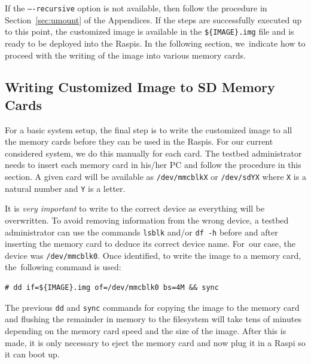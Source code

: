 \documentclass[electronics,article,accept,moreauthors,pdftex,10pt,a4paper]{mdpi}
\theoremstyle{mdpi}
\newcounter{ex}
\newcounter{re}
\theoremstyle{mdpidefinition}
\begin{document}
If the \texttt{----recursive} option is not available, then follow the
procedure in Section~\ref{sec:umount} of the Appendices.
If the steps are successfully executed up to this point, the customized image
is available in the \texttt{\$\{IMAGE\}.img} file and is ready to be deployed
into the Raspis. In the following section, we~indicate how to proceed
with the writing of the image into various memory cards.

\subsection{Writing Customized Image to SD Memory Cards}
For a basic system setup, the final step is to write the customized image
to all the memory cards before they can be used in the Raspis. For
our current considered system, we do this manually for each card.
The testbed administrator needs to insert each memory card in his/her PC
and follow the procedure in this section. A given card will be available as
\texttt{/dev/mmcblkX} or \texttt{/dev/sdYX} where \texttt{X} is a natural number
and \texttt{Y} is a letter.

It is \textit{very important} to write to the correct device as
everything will be overwritten. To avoid removing information from the
wrong device, a testbed administrator can use the commands \texttt{lsblk}
and/or \texttt{df -h} before and after inserting the memory card to deduce
its correct device name.
For~our case, the device was \texttt{/dev/mmcblk0}. Once identified, to write
the image to a memory card, the~following command is used:

\begin{lstlisting}[]
# dd if=${IMAGE}.img of=/dev/mmcblk0 bs=4M && sync
\end{lstlisting}
\FloatBarrier
\vspace{-5mm}

The previous \texttt{dd} and \texttt{sync} commands for copying the image to
the memory card and flushing the remainder in memory to the filesystem
will take tens of minutes depending on the memory card speed and the size of
the image. After this is made, it is only necessary
to eject the memory card and now plug it in a Raspi so it can boot up.

\end{document}
